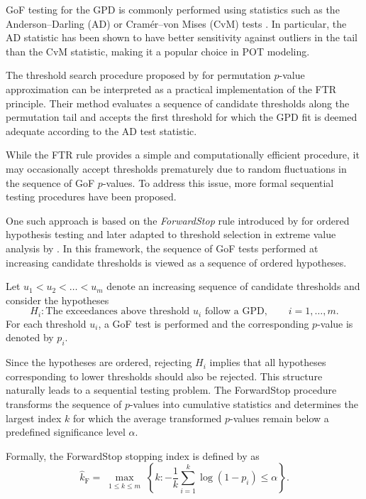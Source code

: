 GoF testing for the GPD is commonly performed using statistics such as the Anderson--Darling (AD) or Cramér--von Mises (CvM) tests \citep{choulakian2001goodnessoffit}. In particular, the AD statistic has been shown to have better sensitivity  against outliers in the tail than the CvM statistic, making it a popular choice in POT modeling.

The threshold search procedure proposed by \citet{knijnenburg2009fewer} for permutation $p$-value approximation can be interpreted as a practical implementation of the FTR principle. Their method evaluates a sequence of candidate thresholds along the permutation tail and accepts the first threshold for which the GPD fit is deemed adequate according to the AD test statistic.

While the FTR rule provides a simple and computationally efficient procedure, it may occasionally accept thresholds prematurely due to random fluctuations in the sequence of GoF $p$-values. To address this issue, more formal sequential testing procedures have been proposed.

One such approach is based on the \emph{ForwardStop} rule introduced by \citet{gsell2016sequential} for ordered hypothesis testing and later adapted to threshold selection in extreme value analysis by \citet{bader2018automated}. In this framework, the sequence of GoF tests performed at increasing candidate thresholds is viewed as a sequence of ordered hypotheses.

Let $u_1 < u_2 < \dots < u_m$ denote an increasing sequence of candidate thresholds and consider the hypotheses
\[
H_i: \text{The exceedances above threshold } u_i \text{ follow a GPD}, \qquad i = 1,\dots,m.
\]
For each threshold $u_i$, a GoF test is performed and the corresponding $p$-value is denoted by $p_i$.

Since the hypotheses are ordered, rejecting $H_i$ implies that all hypotheses corresponding to lower thresholds should also be rejected. This structure naturally leads to a sequential testing problem. The ForwardStop procedure transforms the sequence of $p$-values into cumulative statistics and determines the largest index $k$ for which the average transformed $p$-values remain below a predefined significance level $\alpha$.

Formally, the ForwardStop stopping index is defined by \citet{bader2018automated} as
\begin{equation}
\label{eq:6perm:thresh_fwdstop}
\hat{k}_{\mathrm{F}} = \max_{\substack{1 \le k \le m}}
\left\{
k : -\frac{1}{k} \sum_{i=1}^{k} \log(1-p_i) \le \alpha 
\right\}.
\end{equation}

